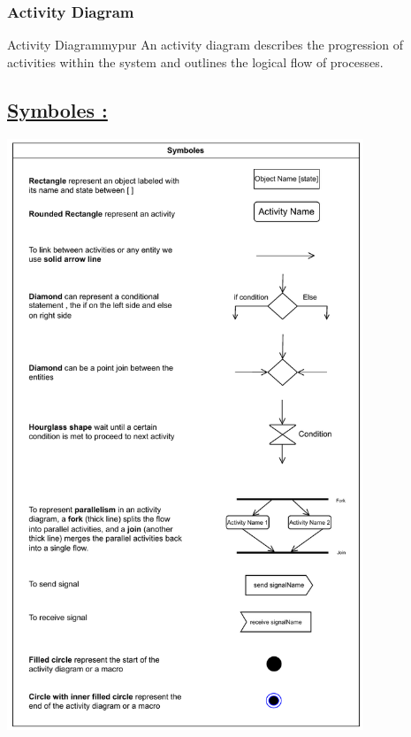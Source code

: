 \vspace{1cm}
\subsubsection{Activity Diagram}

\begin{prettyBox}{Activity Diagram}{mypur}
An activity diagram describes the progression of activities within the system and outlines the logical flow of processes.
\end{prettyBox}

\subsection*{\underline{Symboles :}}

\begin{center}
\includegraphics[width=0.8\textwidth,height=0.98\textheight]{Chapters/Diagram/AC/sym.drawio.pdf}
\end{center}


